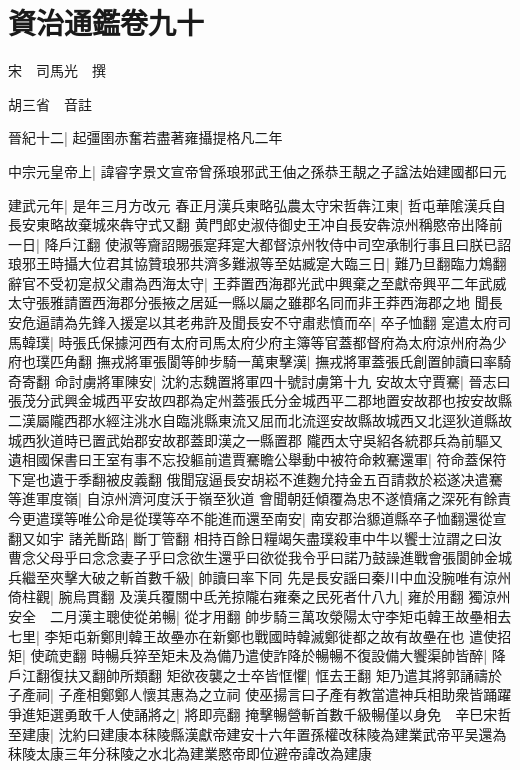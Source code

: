 \chapter{資治通鑑卷九十}
宋　司馬光　撰

胡三省　音註

晉紀十二|{
	起彊圉赤奮若盡著雍攝提格凡二年}


中宗元皇帝上|{
	諱睿字景文宣帝曾孫琅邪武王伷之孫恭王靚之子諡法始建國都曰元}


建武元年|{
	是年三月方改元}
春正月漢兵東略弘農太守宋哲犇江東|{
	哲屯華隂漢兵自長安東略故棄城來犇守式又翻}
黄門郎史淑侍御史王冲自長安犇涼州稱愍帝出降前一日|{
	降戶江翻}
使淑等齎詔賜張寔拜寔大都督涼州牧侍中司空承制行事且曰朕已詔琅邪王時攝大位君其協贊琅邪共濟多難淑等至姑臧寔大臨三日|{
	難乃旦翻臨力鴆翻}
辭官不受初寔叔父肅為西海太守|{
	王莽置西海郡光武中興棄之至獻帝興平二年武威太守張雅請置西海郡分張掖之居延一縣以屬之雖郡名同而非王莽西海郡之地}
聞長安危逼請為先鋒入援寔以其老弗許及聞長安不守肅悲憤而卒|{
	卒子恤翻}
寔遣太府司馬韓璞|{
	時張氏保據河西有太府司馬太府少府主簿等官蓋都督府為太府涼州府為少府也璞匹角翻}
撫戎將軍張閬等帥步騎一萬東擊漢|{
	撫戎將軍蓋張氏創置帥讀曰率騎奇寄翻}
命討虜將軍陳安|{
	沈約志魏置將軍四十號討虜第十九}
安故太守賈騫|{
	晉志曰張茂分武興金城西平安故四郡為定州蓋張氏分金城西平二郡地置安故郡也按安故縣二漢屬隴西郡水經注洮水自臨洮縣東流又屈而北流逕安故縣故城西又北逕狄道縣故城西狄道時已置武始郡安故郡蓋即漢之一縣置郡}
隴西太守吳紹各統郡兵為前驅又遺相國保書曰王室有事不忘投軀前遣賈騫瞻公舉動中被符命敕騫還軍|{
	符命蓋保符下寔也遺于季翻被皮義翻}
俄聞寇逼長安胡崧不進麴允持金五百請救於崧遂决遣騫等進軍度嶺|{
	自涼州濟河度沃于嶺至狄道}
會聞朝廷傾覆為忠不遂憤痛之深死有餘責今更遣璞等唯公命是從璞等卒不能進而還至南安|{
	南安郡治䝠道縣卒子恤翻還從宣翻又如宇}
諸羌斷路|{
	斷丁管翻}
相持百餘日糧竭矢盡璞殺車中牛以饗士泣謂之曰汝曹念父母乎曰念念妻子乎曰念欲生還乎曰欲從我令乎曰諾乃鼓譟進戰會張閬帥金城兵繼至夾擊大破之斬首數千級|{
	帥讀曰率下同}
先是長安謡曰秦川中血没腕唯有涼州倚柱觀|{
	腕烏貫翻}
及漢兵覆關中氐羌掠隴右雍秦之民死者什八九|{
	雍於用翻}
獨涼州安全　二月漢主聰使從弟暢|{
	從才用翻}
帥步騎三萬攻滎陽太守李矩屯韓王故壘相去七里|{
	李矩屯新鄭則韓王故壘亦在新鄭也戰國時韓滅鄭徙都之故有故壘在也}
遣使招矩|{
	使疏吏翻}
時暢兵猝至矩未及為備乃遣使詐降於暢暢不復設備大饗渠帥皆醉|{
	降戶江翻復扶又翻帥所類翻}
矩欲夜襲之士卒皆恇懼|{
	恇去王翻}
矩乃遣其將郭誦禱於子產祠|{
	子產相鄭鄭人懷其惠為之立祠}
使巫揚言曰子產有教當遣神兵相助衆皆踊躍爭進矩選勇敢千人使誦將之|{
	將即亮翻}
掩擊暢營斬首數千級暢僅以身免　辛巳宋哲至建康|{
	沈約曰建康本秣陵縣漢獻帝建安十六年置孫權改秣陵為建業武帝平吴還為秣陵太康三年分秣陵之水北為建業愍帝即位避帝諱改為建康}
